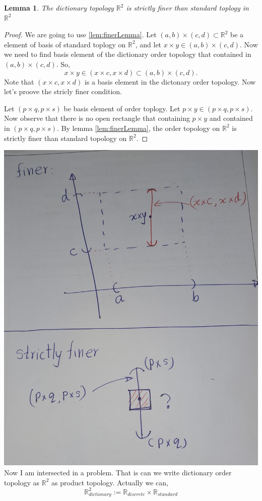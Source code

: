 \documentclass[
]{book}
\newtheorem{lemma}{Lemma}[chapter]
\theoremstyle{definition}
\theoremstyle{definition}
\theoremstyle{definition}
\theoremstyle{definition}
\theoremstyle{remark}
\begin{document}
\begin{lemma}
\protect\hypertarget{lem:unnamed-chunk-39}{}\label{lem:unnamed-chunk-39}The dictionary topology \(\mathbb{R}^2\) is strictly finer than standard toplogy in \(\mathbb{R}^2\)
\end{lemma}

\begin{proof}
We are going to use \ref{lem:finerLemma}.
Let \((a,b)\times(c,d)\subset\mathbb{R}^2\) be a element of basis of standard toplogy on \(\mathbb{R}^2\), and let \(x\times y\in (a,b)\times (c,d)\). Now we need to find basis element of the dictionary order topology that contained in \((a,b)\times (c,d)\).
So,
\[x\times y \in (x\times c ,x\times d)\subset (a,b)\times(c,d).\]
Note that \((x\times c ,x\times d)\) is a basis element in the dictonary order topology. Now let's proove the stricly finer condition.

Let \((p\times q,p \times s)\) be basis element of order toplogy. Let \(p\times y \in (p\times q,p \times s)\). Now observe that there is no open rectangle that containing \(p\times y\) and contained in \((p\times q,p \times s)\). By lemma \ref{lem:finerLemma}, the order topology on \(\mathbb{R}^2\) is strictly finer than standard topology on \(\mathbb{R}^2\).
\end{proof}

\includegraphics{figures/figure 11.jpg}
Now I am intersected in a problem. That is can we write dictionary order topology as \(\mathbb{R}^2\) as product topology. Actually we can,
\[\mathbb{R}^2_{dictionary}:=\mathbb{R}_{discrete }\times \mathbb{R}_{standard}\]
\end{document}
